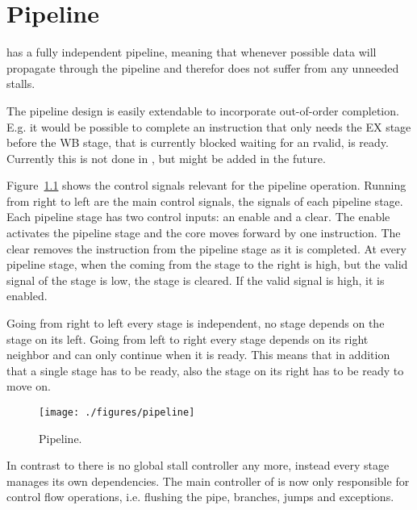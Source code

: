 \chapter{Pipeline}
\label{chap:pipeline}

\rvcore has a fully independent pipeline, meaning that whenever possible data
will propagate through the pipeline and therefor does not suffer from any
unneeded stalls.

The pipeline design is easily extendable to incorporate out-of-order
completion. E.g. it would be possible to complete an instruction that only
needs the EX stage before the WB stage, that is currently blocked waiting for
an rvalid, is ready.
Currently this is not done in \rvcore, but might be added in the future.

Figure~\ref{fig:pipeline} shows the control signals relevant for the pipeline
operation. Running from right to left are the main control signals, the
 signals of each pipeline stage.
Each pipeline stage has two control inputs: an enable and a clear. The enable
activates the pipeline stage and the core moves forward by one instruction. The
clear removes the instruction from the pipeline stage as it is completed.
At every pipeline stage, when the  coming from the stage to the
right is high, but the valid signal of the stage is low, the stage is cleared.
If the valid signal is high, it is enabled.

Going from right to left every stage is independent, no stage depends on the
stage on its left. Going from left to right every stage depends on its right
neighbor and can only continue when it is ready.
This means that in addition that a single stage has to be ready, also the stage
on its right has to be ready to move on.

\begin{figure}[H]
  \centering
  \texttt{[image: ./figures/pipeline]}
  \caption{\rvcore Pipeline.}
  \label{fig:pipeline}
\end{figure}



\begin{boxnote}
In contrast to \orion there is no global stall controller any more, instead
every stage manages its own dependencies. The main controller of \rvcore is now
only responsible for control flow operations, i.e. flushing the pipe, branches,
jumps and exceptions.
\end{boxnote}
